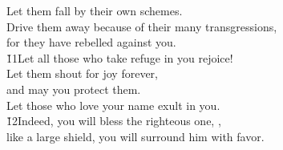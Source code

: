 \begin{poetry}
\poemll    Let them fall by their own schemes. \\
\poeml Drive them away because of their many transgressions, \\
\poemll    for they have rebelled against you. \\
\poeml \v{11}Let all those who take refuge in you rejoice! \\
\poemll    Let them shout for joy forever, \\
\poeml and may you protect them. \\
\poemll    Let those who love your name exult in you. \\
\poeml \v{12}Indeed, you will bless the righteous one, , \\
\poemll    like a large shield, you will surround him with favor.
\end{poetry}


